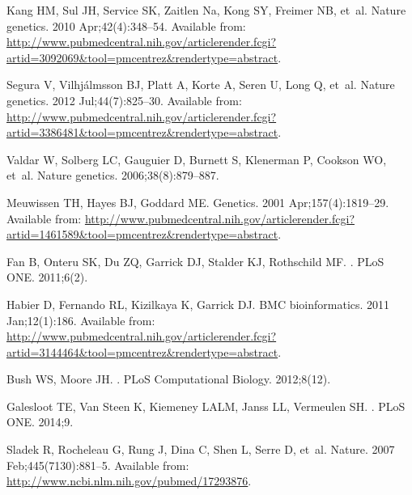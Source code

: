 \documentclass[10pt,letterpaper]{article}
\begin{document}
\begin{thebibliography}{10}
Kang HM, Sul JH, Service SK, Zaitlen Na, Kong SY, Freimer NB, et~al.
\newblock Nature genetics. 2010 Apr;42(4):348--54.
\newblock Available from:
  \url{http://www.pubmedcentral.nih.gov/articlerender.fcgi?artid=3092069\&tool=pmcentrez\&rendertype=abstract}.

Segura V, Vilhj\'{a}lmsson BJ, Platt A, Korte A, Seren U, Long Q, et~al.
\newblock Nature genetics. 2012 Jul;44(7):825--30.
\newblock Available from:
  \url{http://www.pubmedcentral.nih.gov/articlerender.fcgi?artid=3386481\&tool=pmcentrez\&rendertype=abstract}.

Valdar W, Solberg LC, Gauguier D, Burnett S, Klenerman P, Cookson WO, et~al.
\newblock Nature genetics. 2006;38(8):879--887.

Meuwissen TH, Hayes BJ, Goddard ME.
\newblock Genetics. 2001 Apr;157(4):1819--29.
\newblock Available from:
  \url{http://www.pubmedcentral.nih.gov/articlerender.fcgi?artid=1461589\&tool=pmcentrez\&rendertype=abstract}.

Fan B, Onteru SK, Du ZQ, Garrick DJ, Stalder KJ, Rothschild MF.
.
\newblock PLoS ONE. 2011;6(2).

Habier D, Fernando RL, Kizilkaya K, Garrick DJ.
\newblock BMC bioinformatics. 2011 Jan;12(1):186.
\newblock Available from:
  \url{http://www.pubmedcentral.nih.gov/articlerender.fcgi?artid=3144464\&tool=pmcentrez\&rendertype=abstract}.

Bush WS, Moore JH.
.
\newblock PLoS Computational Biology. 2012;8(12).

Galesloot TE, {Van Steen} K, Kiemeney LALM, Janss LL, Vermeulen SH.
.
\newblock PLoS ONE. 2014;9.

Sladek R, Rocheleau G, Rung J, Dina C, Shen L, Serre D, et~al.
\newblock Nature. 2007 Feb;445(7130):881--5.
\newblock Available from: \url{http://www.ncbi.nlm.nih.gov/pubmed/17293876}.


\end{thebibliography}
\end{document}
